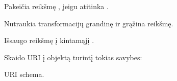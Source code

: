 \documentclass[letterpaper,10pt,lithuanian]{sphinxmanual}
\begin{document}
\begin{fulllineitems}
\begin{fulllineitems}
\label{\detokenize{formules:swap}}
\pysigstartsignatures
\pysiglinewithargsret
{}
{\sphinxparamcomma {}}
{}
\pysigstopsignatures
\sphinxAtStartPar
Pakeičia  reikšmę , jeigu  atitinka .

\end{fulllineitems}


\begin{fulllineitems}
\label{\detokenize{formules:return}}
\pysigstartsignatures
\pysiglinewithargsret
{}
{}
{}
\pysigstopsignatures
\sphinxAtStartPar
Nutraukia transformacijų grandinę ir grąžina reikšmę.

\end{fulllineitems}


\begin{fulllineitems}
\label{\detokenize{formules:id16}}
\pysigstartsignatures
\pysiglinewithargsret
{}
{}
{}
\pysigstopsignatures
\sphinxAtStartPar
Išsaugo reikšmę į kintamąjį .

\end{fulllineitems}


\begin{fulllineitems}
\label{\detokenize{formules:url}}
\pysigstartsignatures
\pysiglinewithargsret
{}
{}
{}
\pysigstopsignatures
\sphinxAtStartPar
Skaido URI į objektą turintį tokias savybes:
\begin{description}
\sphinxAtStartPar
URI schema.


\end{description}
\end{fulllineitems}
\end{fulllineitems}
\end{document}
